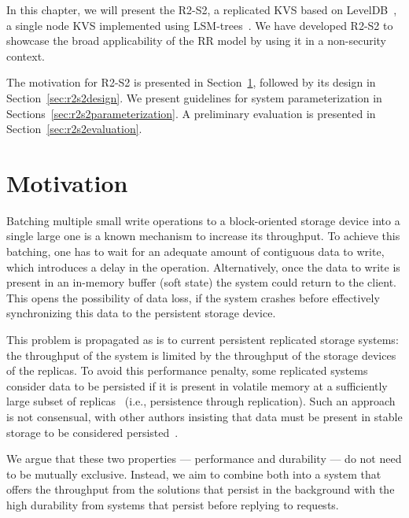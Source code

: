 \label{chap:storage}
\cleardoublepage{}

In this chapter, we will present the \acf{R2-S2}, a replicated
\ac{KVS} based on LevelDB~\cite{leveldb}, a single node \ac{KVS}
implemented using  \acp{LSM-tree}~\cite{lsm}. We have developed
\ac{R2-S2} to showcase the broad applicability of the \ac{RR}
model by using it in a non-security context.

The motivation for \ac{R2-S2} is presented in
Section~\ref{sec:r2s2motivation}, followed by its design in
Section~\ref{sec:r2s2design}. We present guidelines for system
parameterization in Sections~\ref{sec:r2s2parameterization}.
A preliminary evaluation is presented in Section~\ref{sec:r2s2evaluation}.

\section{Motivation}\label{sec:r2s2motivation}
Batching multiple small write operations to a block-oriented storage device into a
single large one is a known mechanism to increase its throughput.
To achieve this batching, one has to wait for an adequate amount
of contiguous data to write, which introduces a delay in the
operation. Alternatively, once the data to write is present in
an in-memory buffer (soft state) the system could return to the
client. This opens the possibility of data loss, if the system
crashes before effectively synchronizing this data to the persistent
storage device.

%
This problem is propagated as is to current persistent replicated storage
systems: the throughput of the system is limited by the
throughput of the storage devices of the replicas. To avoid this
performance penalty, some replicated systems consider data to be persisted if it is
present in volatile memory at a sufficiently large subset of replicas~\cite{pbft}
(i.e., persistence through replication). Such an approach is not
consensual, with other authors insisting that data must be
present in stable storage to be considered
persisted~\cite{bolosky:paxos}.

We argue that these two properties --- performance and
durability --- do not need to be mutually exclusive. Instead, we
aim to combine both into a system that offers the throughput from
the solutions that persist in the background with the high
durability from systems that persist before replying to
requests.

